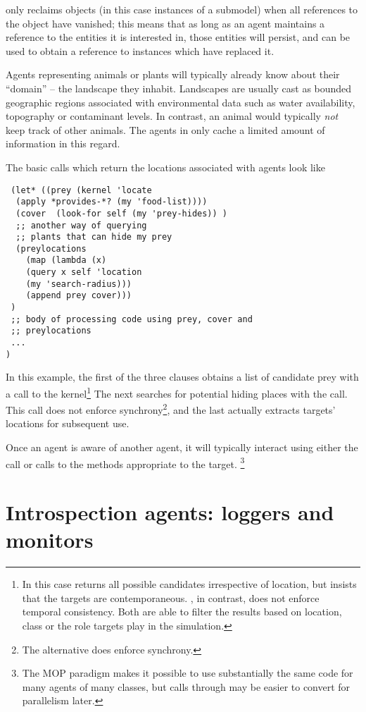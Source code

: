 \Scheme only reclaims objects (in this case instances of a submodel)
when all references to the object have vanished; this means that as
long as an agent maintains a reference to the entities it is
interested in, those entities will persist, and can be used to obtain
a reference to instances which have replaced it.

Agents representing animals or plants will typically already know
about their ``domain'' -- the landscape they inhabit.  Landscapes are
usually cast as bounded geographic regions associated with
environmental data such as water availability, topography or
contaminant levels. In contrast, an animal would typically \emph{not}
keep track of other animals.  The agents in \ReModel only
cache a limited amount of information in this regard.

The basic calls which return the locations associated with agents look
like
\begin{verbatim}
 (let* ((prey (kernel 'locate 
  (apply *provides-*? (my 'food-list))))
  (cover  (look-for self (my 'prey-hides)) )
  ;; another way of querying
  ;; plants that can hide my prey
  (preylocations 
    (map (lambda (x) 
    (query x self 'location 
    (my 'search-radius))) 
    (append prey cover)))
 )
 ;; body of processing code using prey, cover and 
 ;; preylocations
 ...
)
\end{verbatim}
In this example, the first of the three clauses obtains a list of
candidate prey with a call to the kernel\footnote{In this case
 returns all possible candidates irrespective of
location, but insists that the targets are
contemporaneous. , in contrast, does not enforce
temporal consistency. Both are able to filter the results based on
location, class or the role targets play in the simulation.}  The
next searches for potential hiding places with the 
call. This call does not enforce synchrony\footnote{The alternative
 does enforce synchrony.}, and the last actually
extracts targets' locations for subsequent use.

Once an agent is aware of another agent, it will typically interact
using either the  call or calls to the methods
appropriate to the target. \footnote{The MOP paradigm makes it possible to use
substantially the same code for many agents of many classes, but calls
through  may be easier to convert for parallelism later.}


\section{Introspection agents: loggers and monitors}


